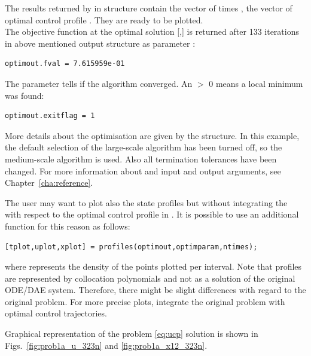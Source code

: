 The results returned by  in  structure
contain the vector of times , the vector of optimal control
profile . They are ready to be plotted.\\
The objective function at the optimal solution [,]
is returned after 133 iterations in above mentioned output structure
 as parameter :
\begin{verbatim}
optimout.fval = 7.615959e-01
\end{verbatim}
The parameter  tells if the algorithm converged. An
 $>$ 0 means a local minimum was found: 
\begin{verbatim}
optimout.exitflag = 1
\end{verbatim}
More details about the optimisation are given by the
 structure. In this example, the default
selection of the large-scale algorithm has been turned off, so the
medium-scale algorithm is used. Also all termination tolerances have
been changed. For more information about  and
 input and output arguments, see Chapter~\ref{cha:reference}. 

The user may want to plot also the state profiles but without
integrating the  with respect to the optimal control
profile in . It is possible to use an additional
function  for this reason as follows:
\begin{verbatim}
[tplot,uplot,xplot] = profiles(optimout,optimparam,ntimes);
\end{verbatim}
where  represents the density of the points plotted per
interval. Note that profiles are represented by collocation
polynomials and not as a solution of the original ODE/DAE
system. Therefore, there might be slight differences with regard to
the original problem. For more precise plots, integrate the original
problem with optimal control trajectories.

Graphical representation of the problem \eqref{eq:ucp} solution is
shown in Figs.~\ref{fig:prob1a_u_323n} and \ref{fig:prob1a_x12_323n}. 

